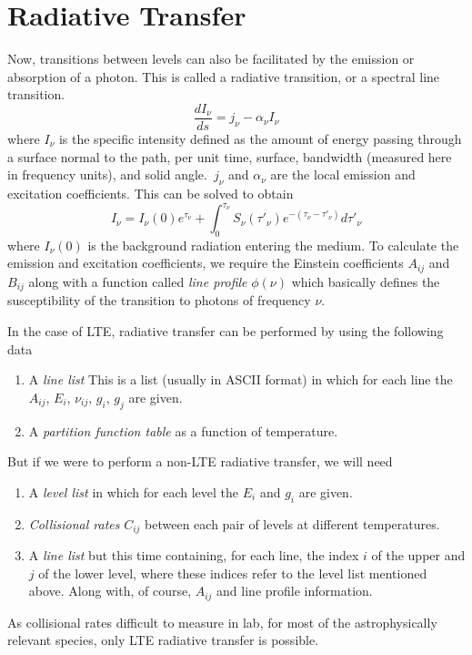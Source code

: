 \documentclass{article}
\begin{document}
\section{Radiative Transfer}
Now, transitions between levels can also be facilitated by 
the emission or absorption of a photon. 
This is called a radiative transition, 
or a spectral line transition.
\begin{equation}
    \dfrac{d I_{\nu}}{ds} = j_{\nu} - \alpha_{\nu} I_{\nu}
\end{equation}
where \(I_{\nu}\) is the specific intensity defined as the 
amount of energy passing through a surface normal to the path, 
per unit time, surface, bandwidth (measured here in frequency 
units), and solid angle.\ \(j_{\nu}\) and \(\alpha_{\nu}\) are
the local emission and excitation coefficients. This can be solved
to obtain
\begin{equation}
    I_{\nu} = I_{\nu} (0) {e}^{\tau_{\nu}} + \int_0^{\tau_{\nu}}
    S_{\nu} (\tau'_{\nu}) {e}^{-(\tau_{\nu}-\tau'_{\nu})} d\tau'_{\nu}
\end{equation}
where \(I_{\nu} (0)\) is the background radiation entering the medium.
To calculate the emission and excitation coefficients, we require the
Einstein coefficients \(A_{ij}\) and \(B_{ij}\) along with a function 
called \textit{line profile} \(\phi(\nu)\) which basically defines the susceptibility 
of the transition to photons of frequency \(\nu\).

In the case of LTE, radiative transfer can be performed by using the
following data
\begin{enumerate}
    \item A \textit{line list} This is a list (usually in ASCII format) 
    in which for each line the \(A_{ij}\), \(E_i\), \(\nu_{ij}\),
    \(g_i\), \(g_j\) are given.
    \item A \textit{partition function table} as a function of
    temperature.
\end{enumerate}
But if we were to perform a non-LTE radiative transfer, we will need
\begin{enumerate}
    \item A \textit{level list} in which for each level the
    \(E_i\) and \(g_i\) are given.
    \item \textit{Collisional rates} \(C_{ij}\) between each pair of levels
    at different temperatures.
    \item A \textit{line list} but this time containing, for each line, 
    the index \(i\) of the upper and
    \(j\) of the lower level, where these indices refer to the level list mentioned above.
    Along with, of course, \(A_{ij}\) and line profile information.
\end{enumerate}
As collisional rates difficult to measure in lab, for most of the 
astrophysically relevant species, only LTE radiative transfer is
possible.
\end{document}
